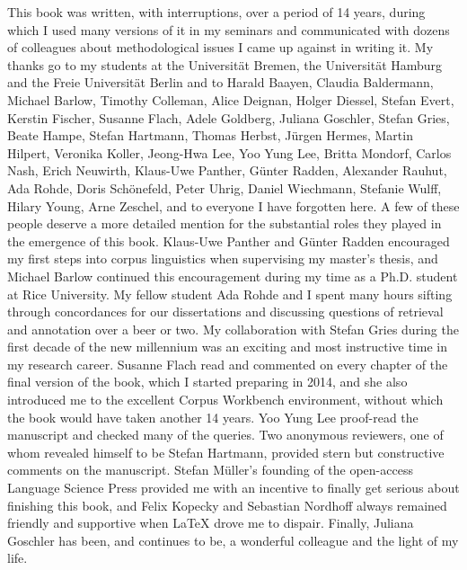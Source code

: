 \addchap{\lsAcknowledgementTitle} 

This book was written, with interruptions, over a period of 14 years, during which I used many versions of it in my seminars and communicated with dozens of colleagues about methodological issues I came up against in writing it. My thanks go to my students at the
Universität Bremen, the Universität Hamburg and the Freie Universität Berlin and to Harald Baayen, Claudia Baldermann, Michael Barlow, Timothy Colleman, Alice Deignan, Holger Diessel, Stefan Evert, Kerstin Fischer, Susanne Flach, Adele Goldberg, Juliana Goschler, Stefan Gries, Beate Hampe, Stefan Hartmann, Thomas Herbst, Jürgen Hermes, Martin Hilpert, Veronika Koller, Jeong-Hwa Lee, Yoo Yung Lee, Britta Mondorf, Carlos Nash, Erich Neuwirth, Klaus-Uwe Panther, Günter Radden, Alexander Rauhut, Ada Rohde, Doris Schönefeld, Peter Uhrig, Daniel Wiechmann, Stefanie Wulff, Hilary Young, Arne Zeschel, and to everyone I have forgotten here. A few of these people deserve a more detailed mention for the substantial roles they played in the emergence of this book. Klaus-Uwe Panther and Günter Radden encouraged my first steps into corpus linguistics when supervising my master's thesis, and Michael Barlow continued this encouragement during my time as a Ph.D. student at Rice University. My fellow student Ada Rohde and I spent many hours sifting through concordances for our dissertations and discussing questions of retrieval and annotation over a beer or two. My collaboration with Stefan Gries during the first decade of the new millennium was an exciting and most instructive time in my research career. Susanne Flach read and commented on every chapter of the final version of the book, which I started preparing in 2014, and she also introduced me to the excellent Corpus Workbench environment, without which the book would have taken another 14 years. Yoo Yung Lee proof-read the manuscript and checked many of the queries. Two anonymous reviewers, one of whom revealed himself to be Stefan Hartmann, provided stern but constructive comments on the manuscript. Stefan Müller's founding of the open-access Language Science Press provided me with an incentive to finally get serious about finishing this book, and Felix Kopecky and Sebastian Nordhoff always remained friendly and supportive when {\LaTeX} drove me to dispair. Finally, Juliana Goschler has been, and continues to be, a wonderful colleague and the light of my life.
